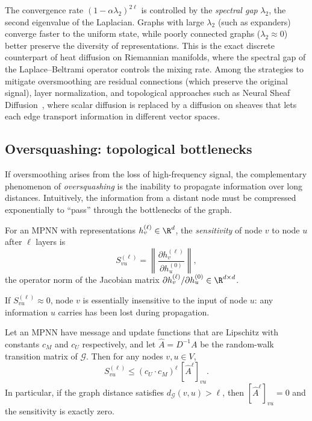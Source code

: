 \begin{remark}
\label{rem:priors:oversmoothing}
The convergence rate $(1 - \alpha \lambda_2)^{2\ell}$ is controlled by the
\emph{spectral gap} $\lambda_2$, the second eigenvalue of the Laplacian. Graphs
with large $\lambda_2$ (such as expanders) converge faster to the uniform state,
while poorly connected graphs ($\lambda_2 \approx 0$) better preserve the
diversity of representations. This is the exact discrete counterpart of heat
diffusion on Riemannian manifolds, where the spectral gap of the Laplace--Beltrami
operator controls the mixing rate. Among the strategies to mitigate oversmoothing
are residual connections (which preserve the original signal), layer
normalization, and topological approaches such as Neural Sheaf
Diffusion~\citep{bodnar2022neural}, where scalar diffusion is replaced by a
diffusion on sheaves that lets each edge transport information in different
vector spaces.
\end{remark}

\subsection{Oversquashing: topological bottlenecks}
\label{sec:priors:oversquashing}

If oversmoothing arises from the loss of high-frequency signal, the complementary
phenomenon of \emph{oversquashing} is the inability to propagate information over
long distances. Intuitively, the information from a distant node must be
compressed exponentially to ``pass'' through the bottlenecks of the graph.

\begin{definition}
\label{def:priors:sensitivity}
For an MPNN with representations $h_v^{(\ell)} \in \R^d$, the \emph{sensitivity}
of node $v$ to node $u$ after $\ell$ layers is
\[
  S_{vu}^{(\ell)} = \left\| \frac{\partial h_v^{(\ell)}}{\partial h_u^{(0)}} \right\|,
\]
the operator norm of the Jacobian matrix
$\partial h_v^{(\ell)} / \partial h_u^{(0)} \in \R^{d \times d}$.
\end{definition}

If $S_{vu}^{(\ell)} \approx 0$, node $v$ is essentially insensitive to the input
of node $u$: any information $u$ carries has been lost during propagation.

\begin{proposition}
\label{prop:priors:oversquashing}
Let an MPNN have message and update functions that are Lipschitz with constants
$c_M$ and $c_U$ respectively, and let $\hat A = D^{-1} A$ be the random-walk
transition matrix of $\mathcal{G}$. Then for any nodes $v, u \in V$,
\[
  S_{vu}^{(\ell)} \le (c_U \cdot c_M)^\ell\, [\hat A^\ell]_{vu}.
\]
In particular, if the graph distance satisfies $d_{\mathcal{G}}(v, u) > \ell$,
then $[\hat A^\ell]_{vu} = 0$ and the sensitivity is exactly zero.
\end{proposition}

